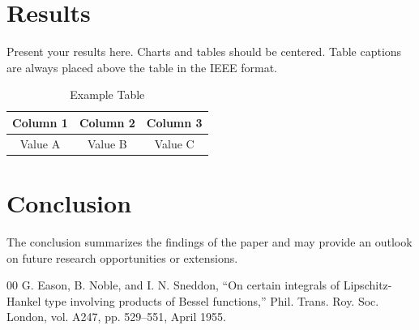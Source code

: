 \documentclass[conference, a4paper]{IEEEtran}
\begin{document}
\section{Results}
Present your results here. Charts and tables should be centered. Table captions are always placed above the table in the IEEE format.

\begin{table}[htbp]
\caption{Example Table}
\begin{center}
\begin{tabular}{|c|c|c|}
\hline
\textbf{Column 1} & \textbf{Column 2} & \textbf{Column 3} \\
\hline
Value A & Value B & Value C \\
\hline
\end{tabular}
\label{tab1}
\end{center}
\end{table}

\section{Conclusion}
The conclusion summarizes the findings of the paper and may provide an outlook on future research opportunities or extensions.

\begin{thebibliography}{00}
 G. Eason, B. Noble, and I. N. Sneddon, ``On certain integrals of Lipschitz-Hankel type involving products of Bessel functions,'' Phil. Trans. Roy. Soc. London, vol. A247, pp. 529--551, April 1955.
\end{thebibliography}
\end{document}
